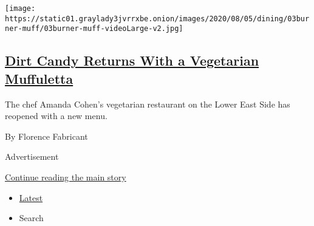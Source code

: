 \begin{enumerate}
  \texttt{[image: https://static01.graylady3jvrrxbe.onion/images/2020/08/05/dining/03burner-muff/03burner-muff-videoLarge-v2.jpg]}

  \hypertarget{dirt-candy-returns-with-a-vegetarian-muffuletta}{%
  \subsection{\texorpdfstring{\href{/2020/08/03/dining/dirt-candy-vegetarian-muffuletta.html}{Dirt
  Candy Returns With a Vegetarian
  Muffuletta}}{Dirt Candy Returns With a Vegetarian Muffuletta}}\label{dirt-candy-returns-with-a-vegetarian-muffuletta}}

  The chef Amanda Cohen's vegetarian restaurant on the Lower East Side
  has reopened with a new menu.

  By Florence Fabricant
\end{enumerate}

Advertisement

\protect\hyperlink{after-mid1}{Continue reading the main story}

\begin{itemize}
\tightlist
\item
  \protect\hyperlink{stream-panel}{Latest}
\item
  Search
\end{itemize}

